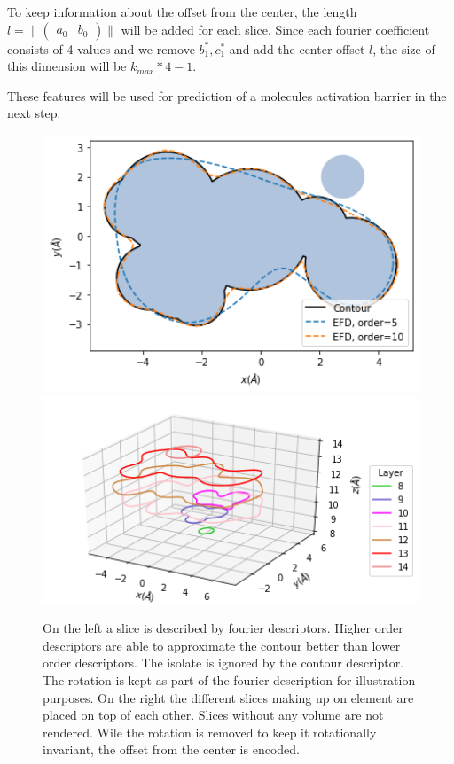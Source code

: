 To keep information about the offset from the center, the length $l = \| \begin{pmatrix} a_0 & b_0 \end{pmatrix} \| $ will be added for each slice.
Since each fourier coefficient consists of 4 values and we remove $b_1^*, c_1^*$ and add the center offset $l$, the size of this dimension will be $k_{max} * 4 - 1$.

These features will be used for prediction of a molecules activation barrier in the next step.

\begin{figure}[h]
    \includegraphics[width=1.0\textwidth]{figures/fourier/contour.png}
  \endminipage\hfill
    \includegraphics[width=1.0\textwidth]{figures/fourier/fourier-slices.png}
  \endminipage
  \caption[Slices produced by LEFD encoder]{
  On the left a slice is described by fourier descriptors. Higher order descriptors are able to approximate the contour better than lower order descriptors. 
  The isolate is ignored by the contour descriptor. The rotation is kept as part of the fourier description for illustration purposes.
  On the right the different slices making up on element are placed on top of each other. Slices without any volume are not rendered. 
  Wile the rotation is removed to keep it rotationally invariant, the offset from the center is encoded.
  }
  \label{fig:slice-layered}
\end{figure}

